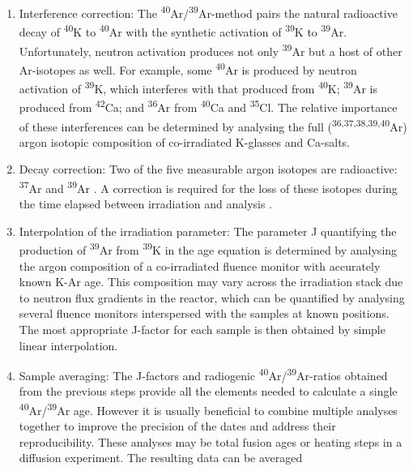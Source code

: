 \documentclass{article}
\begin{document}
\begin{enumerate}
\item Interference correction: The
  \textsuperscript{40}Ar/\textsuperscript{39}Ar-method pairs the
  natural radioactive decay of \textsuperscript{40}K to
  \textsuperscript{40}Ar with the synthetic activation of
  \textsuperscript{39}K to \textsuperscript{39}Ar. Unfortunately,
  neutron activation produces not only \textsuperscript{39}Ar but a
  host of other Ar-isotopes as well. For example, some
  \textsuperscript{40}Ar is produced by neutron activation of
  \textsuperscript{39}K, which interferes with that produced from
  \textsuperscript{40}K; \textsuperscript{39}Ar is produced from
  \textsuperscript{42}Ca; and \textsuperscript{36}Ar from
  \textsuperscript{40}Ca and \textsuperscript{35}Cl. The relative
  importance of these interferences can be determined by analysing the
  full (\textsuperscript{36,37,38,39,40}Ar) argon isotopic composition
  of co-irradiated K-glasses and Ca-salts.
\item Decay correction: Two of the five measurable argon isotopes are
  radioactive: \textsuperscript{37}Ar \citep[t$_{1∕2} = 34.95 \pm
    0.08$ days,][]{renne2001} and \textsuperscript{39}Ar
  \citep[t$_{1∕2} = 269 \pm 3$ years,][]{stoenner1965}. A correction
  is required for the loss of these isotopes during the time elapsed
  between irradiation and analysis \citep{wijbrans1986}.
\item Interpolation of the irradiation parameter: The parameter J
  quantifying the production of \textsuperscript{39}Ar from
  \textsuperscript{39}K in the age equation is determined by analysing
  the argon composition of a co-irradiated fluence monitor with
  accurately known K-Ar age. This composition may vary across the
  irradiation stack due to neutron flux gradients in the reactor,
  which can be quantified by analysing several fluence monitors
  interspersed with the samples at known positions. The most
  appropriate J-factor for each sample is then obtained by simple
  linear interpolation.
\item\label{it:isochron} Sample averaging: The J-factors and
  radiogenic \textsuperscript{40}Ar/\textsuperscript{39}Ar-ratios
  obtained from the previous steps provide all the elements needed to
  calculate a single \textsuperscript{40}Ar/\textsuperscript{39}Ar
  age.  However it is usually beneficial to combine multiple analyses
  together to improve the precision of the dates and address their
  reproducibility. These analyses may be total fusion ages or heating
  steps in a diffusion experiment. The resulting data can be averaged

\end{enumerate}
\end{document}
